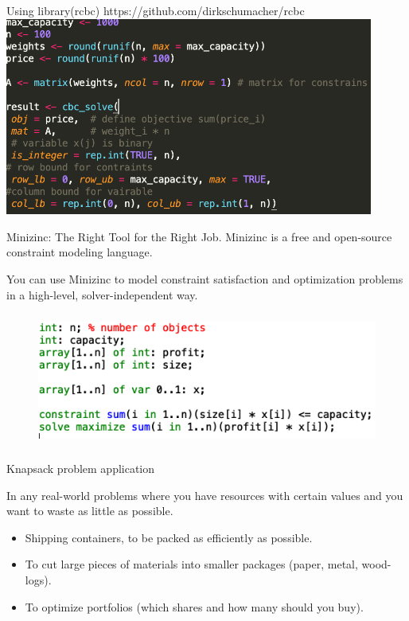 \documentclass[xcolor=dvipsnames,aspectratio=169]{beamer}
\begin{document}
\begin{frame}{Using library(rcbc)}
https://github.com/dirkschumacher/rcbc
 \includegraphics[height =6.5cm]{knapsack.png}
\end{frame}



\begin{frame}{Minizinc: The Right Tool for the Right Job.}
Minizinc is a free and open-source constraint modeling language.

You can use Minizinc to model constraint 
satisfaction and optimization problems in a 
high-level, solver-independent way.

    \begin{figure}
    \centering
        \includegraphics[height =4.4cm]{Minizinc_knapsack.png}
    \end{figure}
\end{frame}


\begin{frame}{Knapsack problem application}
    
In any real-world problems where you have resources with certain values
and you want to waste as little as possible.
    \begin{itemize}
        \item Shipping containers, to be packed as efficiently as possible.
        \item To cut large  pieces of materials into smaller packages (paper, metal, wood-logs).
        \item To optimize portfolios (which shares and how 
        many should you buy).

    \end{itemize}

\end{frame}
\end{document}
